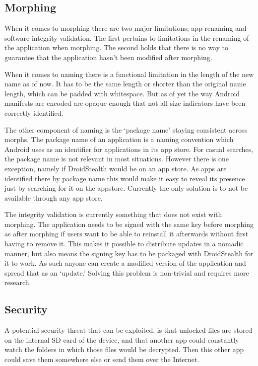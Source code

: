 \documentclass[twocolumn,english,compsoc,journal]{IEEEtran}
\begin{document}
\subsection{Morphing} 

When it comes to morphing there are two major limitations; app renaming and software integrity validation. 
The first pertains to limitations in the renaming of the application when morphing. 
The second holds that there is no way to guarantee that the application hasn't been modified after morphing.

When it comes to naming there is a functional limitation in the length of the new name as of now.
It has to be the same length or shorter than the original name length, which can be padded with whitespace. 
But as of yet the way Android manifests are encoded are opaque enough that not all size indicators have been correctly identified.

The other component of naming is the `package name' staying consistent across morphs. 
The package name of an application is a naming convention which Android uses as an identifier for applications in its app store.
For casual searches, the package name is not relevant in most situations.
However there is one exception, namely if DroidStealth would be on an app store. 
As apps are identified there by package name this would make it easy to reveal its presence just by searching for it on the appstore.
Currently the only solution is to not be available through any app store.

The integrity validation is currently something that does not exist with morphing. 
The application needs to be signed with the same key before morphing as after morphing if users want to be able to reinstall it afterwards without first having to remove it. 
This makes it possible to distribute updates in a nomadic manner, but also means the signing key has to be packaged with DroidStealth for it to work. 
As such anyone can create a modified version of the application and spread that as an `update.'
Solving this problem is non-trivial and requires more research.

\subsection{Security}
A potential security threat that can be exploited, is that
unlocked files are stored on the internal SD card of the device,
and that another app could constantly watch the folders in which
those files would be decrypted. Then this other app could save
them somewhere else or send them over the Internet.
\end{document}
